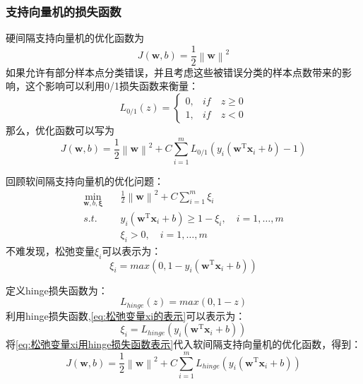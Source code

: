 \documentclass[withoutpreface,bwprint]{NoteBook}
\begin{document}
\subsubsection{支持向量机的损失函数}
硬间隔支持向量机的优化函数为
$$
J(\mathbf{w},b) = \frac{1}{2}\left\| \mathbf{w} \right\|^2
$$
如果允许有部分样本点分类错误，并且考虑这些被错误分类的样本点数带来的影响，这个影响可以利用0/1损失函数来衡量：
\begin{equation}
    L_{0/1}(z) = 
    \begin{cases}
        0, & if \quad z \geq 0 \\
        1, & if \quad z < 0
    \end{cases}
\end{equation}
那么，优化函数可以写为
\begin{equation}
    \label{eq:使用0/1损失函数的优化函数}
J(\mathbf{w},b) = \frac{1}{2}\left\| \mathbf{w} \right\|^2 + C \sum_{i=1}^{m} L_{0/1}(y_i(\mathbf{w}^\mathrm{T} \mathbf{x}_i + b)-1)
\end{equation}

回顾软间隔支持向量机的优化问题：
\begin{align*}
    \min_{\mathbf{w},b,\bm{\xi}} \quad & \frac{1}{2}\left\| \mathbf{w} \right\|^2 + C \sum_{i=1}^{m} \xi_i \nonumber \\
    s.t. \quad  & y_i(\mathbf{w}^\mathrm{T} \mathbf{x}_i + b) \geq 1 - \xi_i,\quad i=1,\dots,m \nonumber\\
                & \xi_i > 0 ,\quad i=1,\dots,m   
\end{align*}
不难发现，松弛变量$\xi_i$可以表示为：
\begin{equation}
    \label{eq:松弛变量xi的表示}
    \xi_i = max(0, 1 - y_i(\mathbf{w}^\mathrm{T} \mathbf{x}_i + b))
\end{equation}

定义hinge损失函数为：
\begin{equation}
    L_{hinge}(z) = max(0, 1 - z)
\end{equation}
利用hinge损失函数,\cref{eq:松弛变量xi的表示}可以表示为：
\begin{equation}
    \label{eq:松弛变量xi用hinge损失函数表示}
    \xi_i = L_{hinge}( y_i(\mathbf{w}^\mathrm{T} \mathbf{x}_i + b))
\end{equation}
将\cref{eq:松弛变量xi用hinge损失函数表示}代入软间隔支持向量机的优化函数，得到：
\begin{equation}
    \label{eq:使用hinge损失函数的优化函数}
J(\mathbf{w},b) = \frac{1}{2}\left\| \mathbf{w} \right\|^2 + C \sum_{i=1}^{m} L_{hinge}(y_i(\mathbf{w}^\mathrm{T} \mathbf{x}_i + b))
\end{equation}
\end{document}
